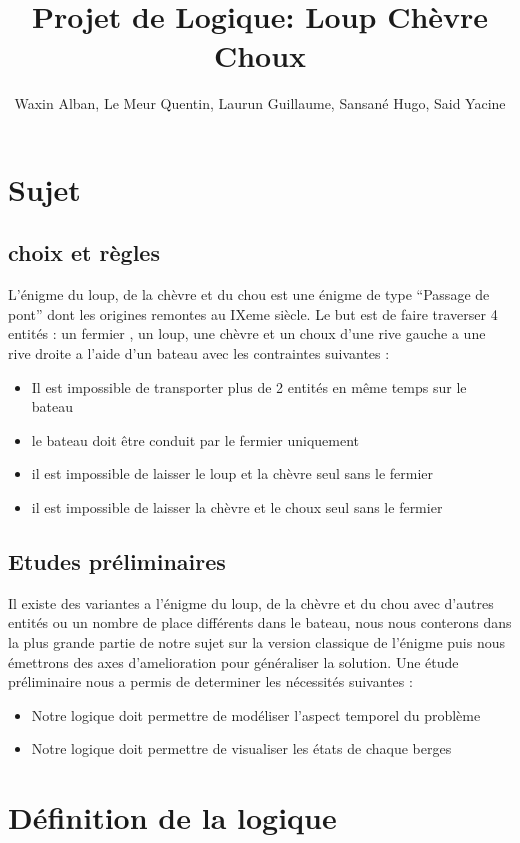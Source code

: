 \documentclass{article}
\title{Projet de Logique: Loup Chèvre Choux}
\author{Waxin Alban, Le Meur Quentin, Laurun Guillaume, Sansané Hugo, Said Yacine}
\begin{document}
\maketitle\newpage
\section{Sujet}
\subsection{choix et règles}
L’énigme du loup, de la chèvre et du chou est une énigme de type “Passage de pont” dont les origines remontes au IXeme siècle.
Le but est de faire traverser 4 entités : un fermier , un loup, une chèvre et un choux d’une rive gauche a une rive droite a l’aide d’un bateau avec les contraintes suivantes :

\begin{itemize}
  \item  Il est impossible de transporter plus de 2 entités en même temps sur le bateau
  \item  le bateau doit être conduit par le fermier uniquement
  \item  il est impossible de laisser le loup et la chèvre seul sans le fermier
  \item  il est impossible de laisser la chèvre et le choux seul sans le fermier
\end{itemize}

\subsection{Etudes préliminaires}
Il existe des variantes a l’énigme du loup, de la chèvre et du chou avec d’autres entités ou un nombre de place différents dans le bateau, nous nous conterons dans la plus grande partie de notre sujet sur la version classique de l’énigme puis nous émettrons des axes d’amelioration pour généraliser la solution.
Une étude préliminaire nous a permis de determiner les nécessités suivantes :
\begin{itemize}
  \item Notre logique doit permettre de modéliser l’aspect temporel du problème
  \item Notre logique doit permettre de visualiser les états de chaque berges
\end{itemize}

\section{Définition de la logique}
\end{document}
